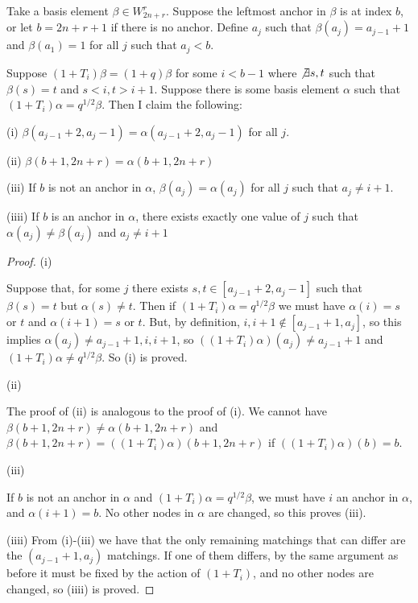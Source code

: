 \documentclass{amsart}
\begin{document}
\vspace{5mm}
\begin{lemma}
	Take a basis element $\beta\in W_{2n+r}^r$. Suppose the leftmost anchor in $\beta$ is at index $b$, or let $b=2n+r+1$ if there is no anchor. Define $a_j$ such that $\beta(a_j)=a_{j-1}+1$ and $\beta(a_1)=1$ for all $j$ such that $a_j<b$. 
	
	Suppose $(1+T_i)\beta=(1+q)\beta$ for some $i<b-1$ where $\not\exists s,t$ such that $\beta(s)=t$ and $s<i,t>i+1$. Suppose there is some basis element $\alpha$ such that $(1+T_i)\alpha=q^{1/2}\beta$. Then I claim the following:
	
	\vspace{5mm}
	\begin{center}
		(i) $\beta(a_{j-1}+2,a_j-1)=\alpha(a_{j-1}+2,a_j-1)$ for all $j$.
		
		\vspace{5mm}
		(ii) $\beta(b+1,2n+r)=\alpha(b+1,2n+r)$
		
		\vspace{5mm}
		(iii)
		If $b$ is not an anchor in $\alpha$, $\beta(a_j)=\alpha(a_j)$ for all $j$ such that $a_j\not=i+1$.
		
		\vspace{5mm}
		(iiii) If $b$ is an anchor in $\alpha$, there exists exactly one value of $j$ such that $\alpha(a_j)\not=\beta(a_j)$ and $a_j\not=i+1$
	\end{center}
\end{lemma}

\begin{proof}
	
	(i)
	
	Suppose that, for some $j$ there exists $s,t\in [a_{j-1}+2,a_j-1]$ such that $\beta(s)=t$ but $\alpha(s)\not=t$. Then if $(1+T_i)\alpha=q^{1/2}\beta$ we must have $\alpha(i)=s$ or $t$ and $\alpha(i+1)=s$ or $t$. But, by definition, $i,i+1\not\in[a_{j-1}+1,a_j]$, so this implies $\alpha(a_j)\not=a_{j-1}+1,i,i+1$, so $((1+T_i)\alpha)(a_j)\not=a_{j-1}+1$ and $(1+T_i)\alpha\not=q^{1/2}\beta$. So (i) is proved.
	
	\vspace{5mm}
	(ii)
	
	The proof of (ii) is analogous to the proof of (i). We cannot have $\beta(b+1,2n+r)\not=\alpha(b+1,2n+r)$ and $\beta(b+1,2n+r)=((1+T_i)\alpha)(b+1,2n+r)$ if $((1+T_i)\alpha)(b)=b$.
	
	\vspace{5mm}
	(iii)
	
	If $b$ is not an anchor in $\alpha$ and $(1+T_i)\alpha=q^{1/2}\beta$, we must have $i$ an anchor in $\alpha$, and $\alpha(i+1)=b$. No other nodes in $\alpha$ are changed, so this proves (iii).
	
	\vspace{5mm}
	(iiii)
	From (i)-(iii) we have that the only remaining matchings that can differ are the $(a_{j-1}+1,a_j)$ matchings. If one of them differs, by the same argument as before it must be fixed by the action of $(1+T_i)$, and no other nodes are changed, so (iiii) is proved.
	
\end{proof}
\end{document}
